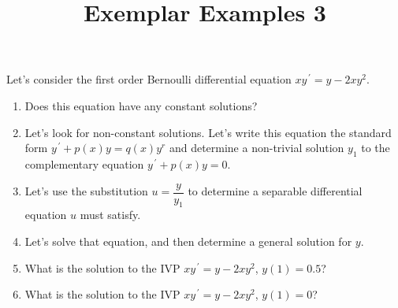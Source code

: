 \documentclass{ximera}
\begin{document}
\begin{abstract}
 \end{abstract}

    \title{Exemplar Examples 3}
    
    \maketitle

Let's consider the first order Bernoulli differential equation $xy^{\,\prime}=y-2xy^2$.

\begin{enumerate}

\item Does this equation have any constant solutions? 


\vfill

\item Let's look for non-constant solutions.  Let's write this equation the standard form $y^{\,\prime}+p(x)y=q(x)y^r$ and determine a non-trivial solution $y_1$ to the complementary equation $y^{\,\prime}+p(x)y=0$.

\vfill
\vfill


\item Let's use the substitution $u=\dfrac{y}{y_1}$ to determine a separable differential equation $u$ must satisfy.



\vfill
\vfill
\vfill

\item Let's solve that equation, and then determine a general solution for $y$.



\vfill
\vfill


\newpage

\item What is the solution to the IVP $xy^{\,\prime}=y-2xy^2$, $y(1)=0.5$?


\vfill


\item What is the solution to the IVP $xy^{\,\prime}=y-2xy^2$, $y(1)=0$?

\vfill


\end{enumerate}
\end{document}
